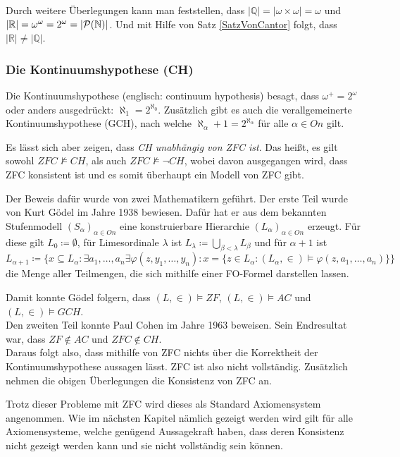 Durch weitere Überlegungen kann man feststellen, dass $\vert \mathbb{Q} \vert=\vert \omega\times\omega \vert = \omega$ und $\vert \mathbb{R} \vert = \omega^\omega = 2^\omega=\vert \mathcal{P}(\mathbb{N})\vert$. Und mit Hilfe von Satz \ref{SatzVonCantor} folgt, dass $\vert \mathbb{R} \vert \neq \vert \mathbb{Q} \vert$.

\subsubsection{Die Kontinuumshypothese (CH)}

Die Kontinuumshypothese (englisch: continuum hypothesis) besagt, dass $\omega^+=2^\omega$ oder anders ausgedrückt: $\aleph_1=2^{\aleph_0}$. Zusätzlich gibt es auch die verallgemeinerte Kontinuumshypothese (GCH), nach welche $\aleph_\alpha+1=2^{\aleph_\alpha}$ für alle $\alpha\in On$ gilt.
\par

Es lässt sich aber zeigen, dass \textit{CH unabhängig von ZFC ist}. Das heißt, es gilt sowohl $ZFC \not\models CH$, als auch $ZFC \not\models \neg CH$, wobei davon ausgegangen wird, dass ZFC konsistent ist und es somit überhaupt ein Modell von ZFC gibt.

Der Beweis dafür wurde von zwei Mathematikern geführt. Der erste Teil wurde von Kurt Gödel im Jahre 1938 bewiesen. Dafür hat er aus dem bekannten Stufenmodell $(S_\alpha)_{\alpha\in On}$ eine konstruierbare Hierarchie $(L_\alpha)_{\alpha\in On}$ erzeugt. Für diese gilt $L_0\coloneqq\emptyset$, für Limesordinale $\lambda$ ist $L_\lambda\coloneqq \bigcup_{\beta<\lambda}L_\beta$ und für $\alpha+1$ ist $L_{\alpha+1}\coloneqq\{x\subseteq L_\alpha : \exists a_1,\dots,a_n\exists\varphi(z,y_1,\dots,y_n) : x=\{z\in L_\alpha : (L_\alpha,\in) \models \varphi(z,a_1,\dots, a_n)\}\}$ die Menge aller Teilmengen, die sich mithilfe einer FO-Formel darstellen lassen.

Damit konnte Gödel folgern, dass $(L,\in)\models ZF$, $(L,\in)\models AC$ und $(L,\in)\models GCH$.
\\
Den zweiten Teil konnte Paul Cohen im Jahre 1963 beweisen. Sein Endresultat war, dass $ZF\notin AC$ und $ZFC \notin CH$.
\\

Daraus folgt also, dass mithilfe von ZFC nichts über die Korrektheit der Kontinuumshypothese aussagen lässt. ZFC ist also nicht vollständig. Zusätzlich nehmen die obigen Überlegungen die Konsistenz von ZFC an.

Trotz dieser Probleme mit ZFC wird dieses als \glqq Standard \grqq{} Axiomensystem angenommen. Wie im nächsten Kapitel nämlich gezeigt werden wird gilt für alle Axiomensysteme, welche genügend Aussagekraft haben, dass deren Konsistenz nicht gezeigt werden kann und sie nicht vollständig sein können.
